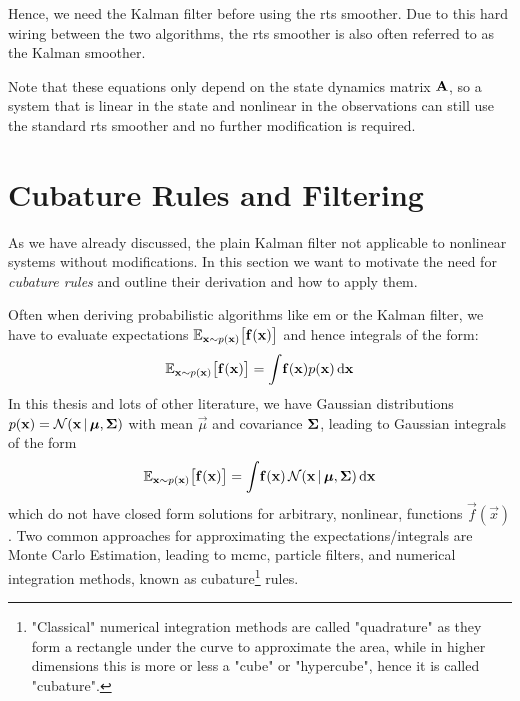 		Hence, we need the Kalman filter before using the \ac{rts} smoother. Due to this hard wiring between the two algorithms, the \ac{rts} smoother is also often referred to as the Kalman smoother.

		Note that these equations only depend on the state dynamics matrix \( \boldsymbol{\mathrm{A}} \), so a system that is linear in the state and nonlinear in the observations can still use the standard \ac{rts} smoother and no further modification is required.

\section{Cubature Rules and Filtering}
	\label{sec:cubatureRules}

	As we have already discussed, the plain Kalman filter not applicable to nonlinear systems without modifications. In this section we want to motivate the need for \emph{cubature rules} and outline their derivation and how to apply them.

	Often when deriving probabilistic algorithms like \ac{em} or the Kalman filter, we have to evaluate expectations \( \mathbb{E}_{\boldsymbol{\mathrm{x}} \sim p(\boldsymbol{\mathrm{x}})}\big[ \boldsymbol{\mathrm{f}}(\boldsymbol{\mathrm{x}}) \big] \) and hence integrals of the form:
	\begin{equation*}
		\mathbb{E}_{\boldsymbol{\mathrm{x}} \sim p(\boldsymbol{\mathrm{x}})}\big[ \boldsymbol{\mathrm{f}}(\boldsymbol{\mathrm{x}}) \big] = \int\! \boldsymbol{\mathrm{f}}(\boldsymbol{\mathrm{x}}) p(\boldsymbol{\mathrm{x}}) \dd{\boldsymbol{\mathrm{x}}}
	\end{equation*}
	In this thesis and lots of other literature, we have Gaussian distributions \( p(\boldsymbol{\mathrm{x}}) = \mathcal{N}(\boldsymbol{\mathrm{x}} \,\vert\, \boldsymbol{\mathrm{\mu}}, \boldsymbol{\mathrm{\Sigma}}) \) with mean \(\vec{\mu}\) and covariance \(\boldsymbol{\mathrm{\Sigma}}\), leading to Gaussian integrals of the form
	\begin{equation*}
		\mathbb{E}_{\boldsymbol{\mathrm{x}} \sim p(\boldsymbol{\mathrm{x}})}\big[ \boldsymbol{\mathrm{f}}(\boldsymbol{\mathrm{x}}) \big] = \int\! \boldsymbol{\mathrm{f}}(\boldsymbol{\mathrm{x}}) \, \mathcal{N}(\boldsymbol{\mathrm{x}} \,\vert\, \boldsymbol{\mathrm{\mu}}, \boldsymbol{\mathrm{\Sigma}}) \dd{\boldsymbol{\mathrm{x}}}
	\end{equation*}
	which do not have closed form solutions for arbitrary, nonlinear, functions \( \vec{f}(\vec{x}) \). Two common approaches for approximating the expectations/integrals are Monte Carlo Estimation, leading to \ac{mcmc}, particle filters, and numerical integration methods, known as cubature\footnote{"Classical" numerical integration methods are called "quadrature" as they form a rectangle under the curve to approximate the area, while in higher dimensions this is more or less a "cube" or "hypercube", hence it is called "cubature".} rules.

